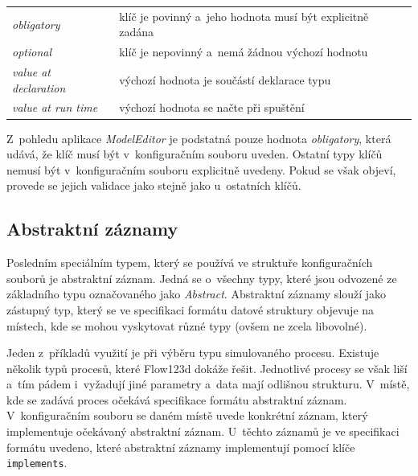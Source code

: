 \documentclass[FM,bw,DP]{tulthesis}
\begin{document}
\begin{longtable}{m{4cm}@{}l}
\textit{obligatory}\dotfill & klíč je povinný a~jeho hodnota musí být explicitně zadána \\
\textit{optional}\dotfill & klíč je nepovinný a~nemá žádnou výchozí hodnotu \\
\textit{value at declaration}\dotfill & výchozí hodnota je součástí deklarace typu \\
\textit{value at run time}\dotfill & výchozí hodnota se načte při spuštění \\
\end{longtable}

Z~pohledu aplikace \textit{ModelEditor} je podstatná pouze hodnota \textit{obligatory}, která udává, že klíč musí být v~konfiguračním souboru uveden. Ostatní typy klíčů nemusí být v~konfiguračním souboru explicitně uvedeny. Pokud se však objeví, provede se jejich validace jako stejně jako u~ostatních klíčů.

\subsection{Abstraktní záznamy}
\label{sec:analyza-specifikace-formatu-abstraktni-zaznamy}

Posledním speciálním typem, který se používá ve struktuře konfiguračních souborů je abstraktní záznam. Jedná se o~všechny typy, které jsou odvozené ze základního typu označovaného jako \textit{Abstract}. Abstraktní záznamy slouží jako zástupný typ, který se ve specifikaci formátu datové struktury objevuje na místech, kde se mohou vyskytovat různé typy (ovšem ne zcela libovolné).


Jeden z~příkladů využití je při výběru typu simulovaného procesu. Existuje několik typů procesů, které Flow123d dokáže řešit. Jednotlivé procesy se však liší a~tím pádem i~vyžadují jiné parametry a~data mají odlišnou strukturu.
V~místě, kde se zadává proces očekává specifikace formátu abstraktní záznam.
V~konfiguračním souboru se daném místě uvede konkrétní záznam, který implementuje očekávaný abstraktní záznam. U~těchto záznamů je ve specifikaci formátu uvedeno, které abstraktní záznamy implementují pomocí klíče \texttt{implements}.
\end{document}
